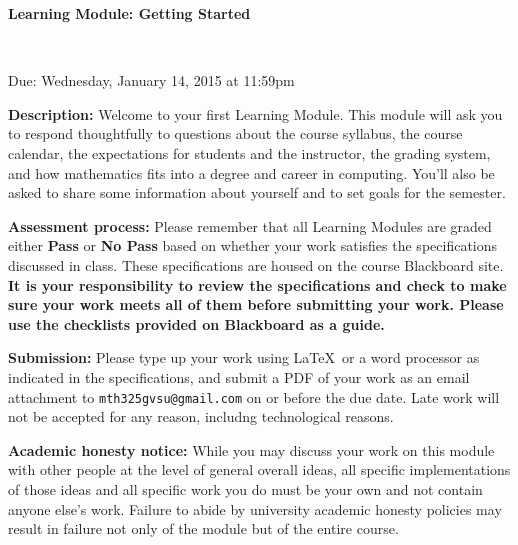 \documentclass[11pt,letterpaper]{article}
\begin{document}
\begin{center}
	\begin{Large}
		\textbf{Learning Module: Getting Started} 
	\end{Large} \\
	\begin{large}
		Due: Wednesday, January 14, 2015 at 11:59pm 
	\end{large}
\end{center}

\textbf{Description:} Welcome to your first Learning Module. This module will ask you to respond thoughtfully to questions about the course syllabus, the course calendar, the expectations for students and the instructor, the grading system, and how mathematics fits into a degree and career in computing. You'll also be asked to share some information about yourself and to set goals for the semester. 

\smallskip




\smallskip

\textbf{Assessment process:} Please remember that all Learning Modules are graded either \textbf{Pass} or \textbf{No Pass} based on whether your work satisfies the specifications discussed in class. These specifications are housed on the course Blackboard site. \textbf{It is your responsibility to review the specifications and check to make sure your work meets all of them before submitting your work. Please use the checklists provided on Blackboard as a guide.} 

\smallskip

\textbf{Submission:} Please type up your work using \LaTeX \, or a word processor as indicated in the specifications, and submit a PDF of your work as an email attachment to \texttt{mth325gvsu@gmail.com} on or before the due date. Late work will not be accepted for any reason, includng technological reasons. 

\smallskip

\textbf{Academic honesty notice:} While you may discuss your work on this module with other people at the level of general overall ideas, all specific implementations of those ideas and all specific work you do must be your own and not contain anyone else's work. Failure to abide by university academic honesty policies may result in failure not only of the module but of the entire course. 
\end{document}
